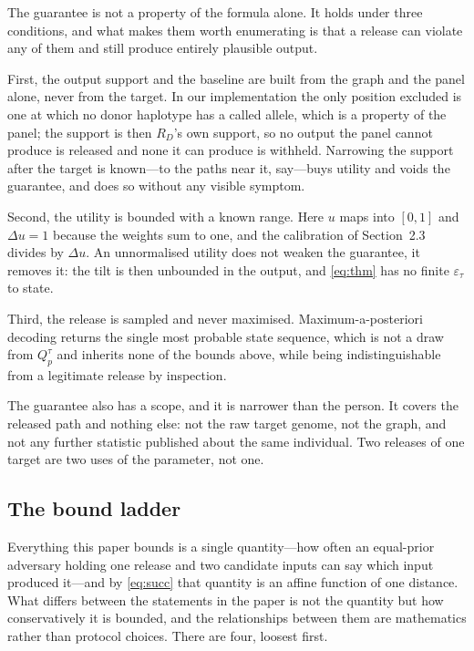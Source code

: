 The guarantee is not a property of the formula alone. It holds under three
conditions, and what makes them worth enumerating is that a release can violate any
of them and still produce entirely plausible output.

First, the output support and the baseline are built from the graph and the panel
alone, never from the target. In our implementation the only position excluded is one
at which no donor haplotype has a called allele, which is a property of the panel;
the support is then $R_D$'s own support, so no output the panel cannot produce is
released and none it can produce is withheld. Narrowing the support after the target
is known---to the paths near it, say---buys utility and voids the guarantee, and does
so without any visible symptom.

Second, the utility is bounded with a known range. Here $u$ maps into $[0,1]$ and
$\Delta u = 1$ because the weights sum to one, and the calibration of Section~2.3
divides by $\Delta u$. An unnormalised utility does not weaken the guarantee, it
removes it: the tilt is then unbounded in the output, and \eqref{eq:thm} has no
finite $\varepsilon_\tau$ to state.

Third, the release is sampled and never maximised. Maximum-a-posteriori decoding
returns the single most probable state sequence, which is not a draw from
$Q^{\tau}_{p}$ and inherits none of the bounds above, while being indistinguishable
from a legitimate release by inspection.

The guarantee also has a scope, and it is narrower than the person. It covers the
released path and nothing else: not the raw target genome, not the graph, and not any
further statistic published about the same individual. Two releases of one target are
two uses of the parameter, not one.

\subsection{The bound ladder}

Everything this paper bounds is a single quantity---how often an equal-prior
adversary holding one release and two candidate inputs can say which input produced
it---and by \eqref{eq:succ} that quantity is an affine function of one distance. What
differs between the statements in the paper is not the quantity but how conservatively
it is bounded, and the relationships between them are mathematics rather than
protocol choices. There are four, loosest first.

